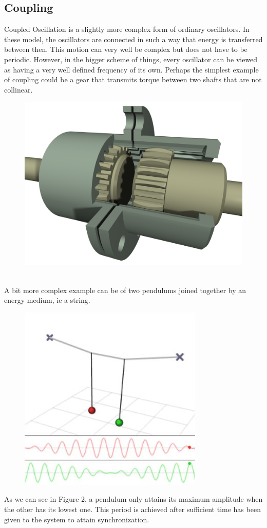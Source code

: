 \documentclass[12pt]{article}
\begin{document}
	\subsection{Coupling}
	Coupled Oscillation is a slightly more complex form of ordinary oscillators. In these model, the oscillators are connected in such a way that energy is transferred between then. This motion can very well be complex but does not have to be periodic. However, in the bigger scheme of things, every oscillator can be viewed as having a very well defined frequency of its own. Perhaps the simplest example of coupling could be a gear that transmits torque between two shafts that are not collinear. 
	\begin{figure}[h!]
		\centering
		\includegraphics[width=0.5\linewidth]{gear}
		\caption{}
		\label{fig:couple}
	\end{figure}
	\\
	A bit more complex example can be of two pendulums joined together by an energy medium, ie a string.
	\begin{figure}[h!]
\centering
\includegraphics[width=0.5\linewidth]{couple}
\caption{}
\label{fig:couple}
\end{figure}

As we can see in Figure 2, a pendulum only attains its maximum amplitude when the other has its lowest one. This period is achieved after sufficient time has been given to the system to attain synchronization.  
\end{document}
